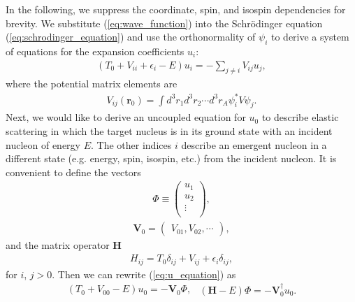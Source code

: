 \documentclass[preprintnumbers,floatfix,aps,prc,preprint,nofootinbib]{revtex4-1}
\begin{document}
In the following, we suppress the coordinate, spin, and isospin dependencies for brevity. We substitute (\ref{eq:wave_function}) into the Schr\"odinger equation (\ref{eq:schrodinger_equation}) and use the orthonormality of $\psi_i$ to derive a system of equations for the expansion coefficients $u_i$:
%
\begin{eqnarray}
	\label{eq:u_equation}
	(T_0 + V_{ii} + \epsilon_i - E) u_i = - \sum_{j \neq i} V_{ij} u_j,
\end{eqnarray}
%
where the potential matrix elements are
%
\begin{eqnarray}
	\label{eq:potential_matrix_elements}
	V_{ij}(\textbf{r}_0) = \int{d^3 r_1 d^3 r_2 \cdots d^3 r_A \psi_i^* V \psi_j}.
\end{eqnarray}
%
Next, we would like to derive an uncoupled equation for $u_0$ to describe elastic scattering in which the target nucleus is in its ground state with an incident nucleon of energy $E$. The other indices $i$ describe an emergent nucleon in a different state (e.g. energy, spin, isospin, etc.) from the incident nucleon. It is convenient to define the vectors
%
\begin{eqnarray}
	\label{eq:u_vector}
	\Phi \equiv
	\begin{pmatrix}
		u_1 \\
		u_2 \\
		\vdots \\
	\end{pmatrix}
	,
\end{eqnarray}
%
\begin{eqnarray}
	\label{eq:potential_vector}
	\textbf{V}_0 =
	\begin{pmatrix}
		V_{01}, V_{02}, \cdots
	\end{pmatrix}
	,
\end{eqnarray}
%
and the matrix operator $\textbf{H}$
%
\begin{eqnarray}
	\label{eq:hamiltonian_operator}
	H_{ij} = T_0 \delta_{ij} + V_{ij} + \epsilon_i \delta_{ij},
\end{eqnarray}
%
for $i$, $j > 0$. Then we can rewrite (\ref{eq:u_equation}) as
%
\begin{subequations}
	\label{eq:u_vector_equation}
	\begin{eqnarray}
		\label{eq:u_vector_equation_a}
		(T_0 + V_{00} - E) u_0 = -\textbf{V}_0 \Phi,
	\end{eqnarray}
	\begin{eqnarray}
		\label{eq:u_vector_equation_b}
		(\textbf{H}-E) \Phi = -\textbf{V}_0^{\dagger} u_0.
	\end{eqnarray}
\end{subequations}
\end{document}
